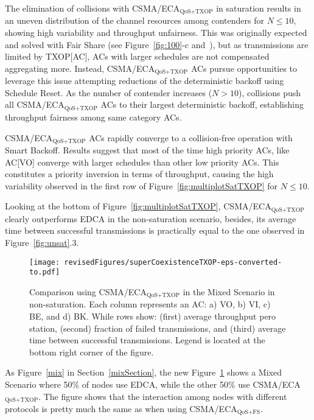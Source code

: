 \documentclass[a4paper]{article}
\begin{document}
The elimination of collisions with CSMA/ECA$_\text{QoS+TXOP}$ in saturation results in an uneven distribution of the channel resources among contenders for $N\le10$, showing high variability and throughput unfairness. This was originally expected and solved with Fair Share (see Figure~\ref{fig:100}-c and~\cite{sanabria2014high}), but as transmissions are limited by TXOP[AC], ACs with larger schedules are not compensated aggregating more. Instead, CSMA/ECA$_\text{QoS+TXOP}$ ACs pursue opportunities to leverage this issue attempting reductions of the deterministic backoff using Schedule Reset. As the number of contender increases ($N>10$), collisions push all CSMA/ECA$_\text{QoS+TXOP}$ ACs to their largest deterministic backoff, establishing throughput fairness among same category ACs.

CSMA/ECA$_\text{QoS+TXOP}$ ACs rapidly converge to a collision-free operation with Smart Backoff. Results suggest that most of the time high priority ACs, like AC[VO] converge with larger schedules than other low priority ACs. This constitutes a priority inversion in terms of throughput, causing the high variability observed in the first row of Figure~\ref{fig:multiplotSatTXOP} for $N\le10$. 

Looking at the bottom of Figure~\ref{fig:multiplotSatTXOP}, CSMA/ECA$_{\text{QoS+TXOP}}$ clearly outperforms EDCA in the non-saturation scenario, besides, its average time between successful transmissions is practically equal to the one observed in Figure~\ref{fig:unsat}.3.

	\begin{figure}[t]
	\centering
		\texttt{[image: revisedFigures/superCoexistenceTXOP-eps-converted-to.pdf]}
		\caption{Comparison using CSMA/ECA$_\text{QoS+TXOP}$ in the Mixed Scenario in non-saturation. Each column represents an AC: a) VO, b) VI, c) BE, and d) BK. While rows show: (first) average throughput pero station, (second) fraction of failed transmissions, and (third) average time between successful transmissions. Legend is located at the bottom right corner of the figure.}
		\label{mixTXOP}
	\end{figure}

As Figure~\ref{mix} in Section~\ref{mixSection}, the new Figure~\ref{mixTXOP} shows a Mixed Scenario where 50\% of nodes use EDCA, while the other 50\% use CSMA/ECA$_{\text{QoS+TXOP}}$. The figure shows that the interaction among nodes with different protocols is pretty much the same as when using CSMA/ECA$_{\text{QoS+FS}}$.
\end{document}
